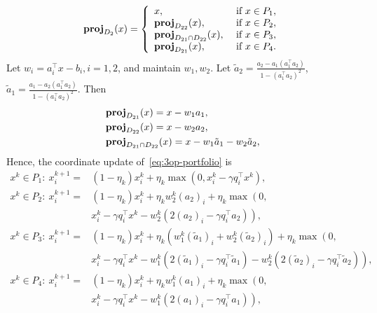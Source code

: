 $$\prj_{D_2}(x)=\left\{
\begin{array}{ll}
x, & \text{ if }x\in P_1,\\
\prj_{D_{22}}(x), &\text{ if }x\in P_2,\\
\prj_{D_{21}\cap D_{22}}(x), & \text{ if }x\in P_3,\\
\prj_{D_{21}}(x), & \text{ if }x\in P_4.
\end{array}
\right.$$
Let $w_i=a_i^\top x-b_i, i=1,2$, and maintain $w_1,w_2$. Let $\tilde{a}_2=\frac{a_2-a_1(a_1^\top a_2)}{1-(a_1^\top a_2)^2}$, $\tilde{a}_1=\frac{a_1-a_2(a_1^\top a_2)}{1-(a_1^\top a_2)^2}$. Then
\begin{align*}
&\prj_{D_{21}}(x)=x-w_1a_1,\\
&\prj_{D_{22}}(x)=x-w_2a_2,\\
&\prj_{D_{21}\cap D_{22}}(x)=x-w_1 \tilde{a}_1-w_2\tilde{a}_2,
\end{align*}
%
%
Hence, the coordinate update of~\eqref{eq:3op-portfolio} is
\begin{subequations}\label{eq:3op-portfolio2}
\begin{align}
x^k\in P_1:\ x_i^{k+1}= & \textstyle (1-\eta_k)x_i^k+\eta_k\max(0, x_i^k-\gamma q_i^\top x^k),\\
x^k\in P_2:\  x_i^{k+1}= & \textstyle (1-\eta_k)x_i^k+\eta_kw_2^k(a_2)_i+\eta_k\max\left(0, \right.\nonumber\\
&\textstyle \left.x_i^k-\gamma q_i^\top x^k-w_2^k(2(a_{2})_i-\gamma q_i^\top a_2)\right),\\
x^k\in P_3:\ x_i^{k+1}= &\textstyle  (1-\eta_k)x_i^k+\eta_k\left(w_1^k (\tilde{a}_{1})_i+w_2^k(\tilde{a}_{2})_i\right)+\eta_k\max\left(0,\right.\nonumber\\
&\textstyle \left.x_i^k-\gamma q_i^\top x^k-w_1^k (2(\tilde{a}_{1})_i-\gamma q_i^\top \tilde{a}_1)-{w}_2^k(2(\tilde{a}_{2})_i-\gamma q_i^\top \tilde{a}_2)\right),\\
x^k\in P_4:\ x_i^{k+1}= &\textstyle  (1-\eta_k)x_i^k+\eta_k w_1^k(a_{1})_i+\eta_k\max\left(0, \right.\nonumber\\
&\textstyle \left.x_i^k-\gamma q_i^\top x^k-w_1^k(2(a_{1})_i-\gamma q_i^\top a_1)\right),
\end{align}
\end{subequations}
